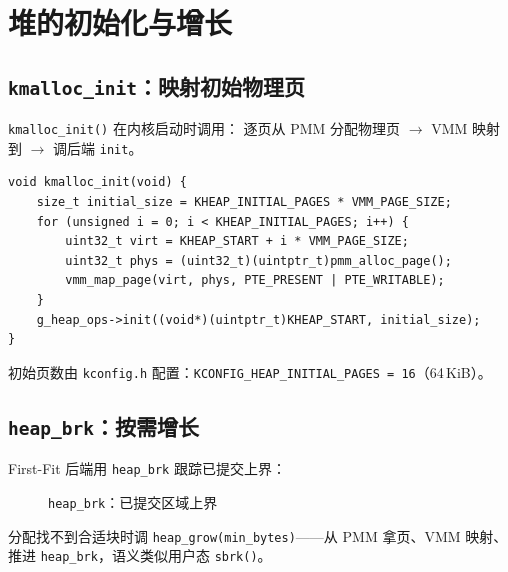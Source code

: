 \section{堆的初始化与增长}

\subsection{\texttt{kmalloc\_init}：映射初始物理页}

\texttt{kmalloc\_init()} 在内核启动时调用：
逐页从 PMM 分配物理页 $\to$ VMM 映射到  $\to$ 调后端 \texttt{init}。

\begin{lstlisting}[style=cstyle]
void kmalloc_init(void) {
    size_t initial_size = KHEAP_INITIAL_PAGES * VMM_PAGE_SIZE;
    for (unsigned i = 0; i < KHEAP_INITIAL_PAGES; i++) {
        uint32_t virt = KHEAP_START + i * VMM_PAGE_SIZE;
        uint32_t phys = (uint32_t)(uintptr_t)pmm_alloc_page();
        vmm_map_page(virt, phys, PTE_PRESENT | PTE_WRITABLE);
    }
    g_heap_ops->init((void*)(uintptr_t)KHEAP_START, initial_size);
}
\end{lstlisting}

初始页数由 \texttt{kconfig.h} 配置：\texttt{KCONFIG\_HEAP\_INITIAL\_PAGES = 16}（64\,KiB）。

\subsection{\texttt{heap\_brk}：按需增长}

First-Fit 后端用 \texttt{heap\_brk} 跟踪已提交上界：

\begin{figure}[H]
  \centering
  
  \caption{\texttt{heap\_brk}：已提交区域上界}
  \label{fig:heap-brk}
\end{figure}

分配找不到合适块时调 \texttt{heap\_grow(min\_bytes)}——从 PMM 拿页、VMM 映射、
推进 \texttt{heap\_brk}，语义类似用户态 \texttt{sbrk()}。


